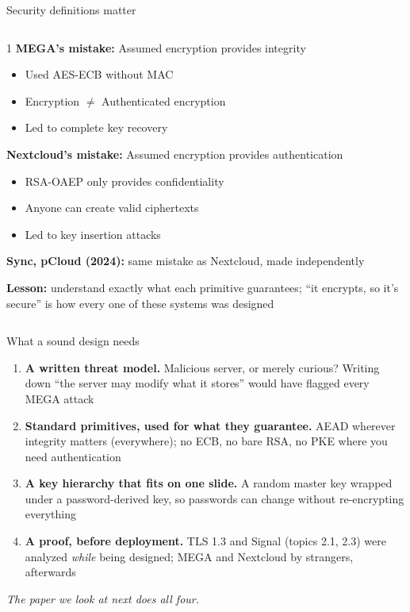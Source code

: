 \ifdefined\PRESENTATION\else\PassOptionsToClass{handout}{beamer}\fi\documentclass[aspectratio=169, lualatex]{beamer}
\begin{document}
\begin{frame}{Security definitions matter}
	\begin{columns}[c]
		\begin{column}{1\textwidth}
			\textbf{MEGA's mistake:} Assumed encryption provides integrity
			\begin{itemize}
				\item Used AES-ECB without MAC
				\item Encryption $\neq$ Authenticated encryption
				\item Led to complete key recovery
			\end{itemize}
			\textbf{Nextcloud's mistake:} Assumed encryption provides authentication
			\begin{itemize}
				\item RSA-OAEP only provides confidentiality
				\item Anyone can create valid ciphertexts
				\item Led to key insertion attacks
			\end{itemize}
			\textbf{Sync, pCloud (2024):} same mistake as Nextcloud, made independently
			\vspace{0.2cm}

			\textbf{Lesson:} understand exactly what each primitive guarantees; ``it encrypts, so it's secure'' is how every one of these systems was designed
		\end{column}
	\end{columns}
\end{frame}

\begin{frame}{What a sound design needs}
	\begin{enumerate}
		\item \textbf{A written threat model.} Malicious server, or merely curious? Writing down ``the server may modify what it stores'' would have flagged every MEGA attack
		\item \textbf{Standard primitives, used for what they guarantee.} AEAD wherever integrity matters (everywhere); no ECB, no bare RSA, no PKE where you need authentication
		\item \textbf{A key hierarchy that fits on one slide.} A random master key wrapped under a password-derived key, so passwords can change without re-encrypting everything
		\item \textbf{A proof, before deployment.} TLS 1.3 and Signal (topics 2.1, 2.3) were analyzed \textit{while} being designed; MEGA and Nextcloud by strangers, afterwards
	\end{enumerate}
	\vspace{0.2cm}
	\begin{center}
		\textit{The paper we look at next does all four.}
	\end{center}
\end{frame}
\end{document}
